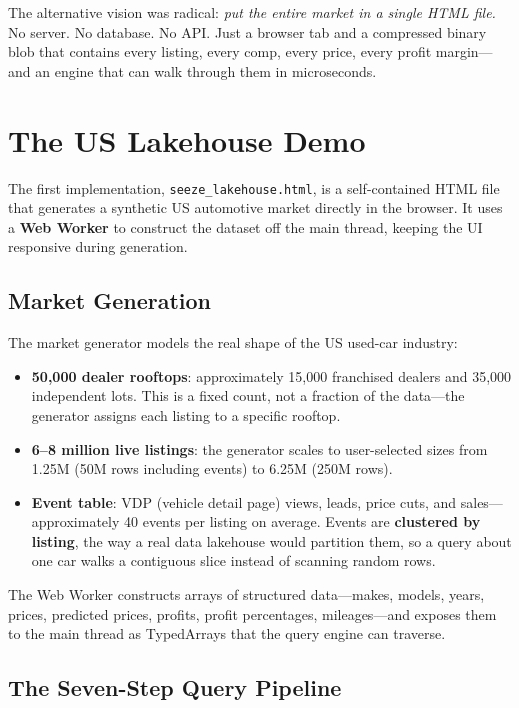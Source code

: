 \documentclass[11pt,a4paper,twoside]{book}
\begin{document}
The alternative vision was radical: \textit{put the entire market in a single HTML file.} No
server. No database. No API. Just a browser tab and a compressed binary blob that contains every
listing, every comp, every price, every profit margin---and an engine that can walk through them
in microseconds.

\section{The US Lakehouse Demo}

The first implementation, \texttt{seeze\_lakehouse.html}, is a self-contained HTML file that
generates a synthetic US automotive market directly in the browser. It uses a \textbf{Web Worker}
to construct the dataset off the main thread, keeping the UI responsive during generation.

\subsection{Market Generation}

The market generator models the real shape of the US used-car industry:

\begin{itemize}[leftmargin=*]
    \item \textbf{50,000 dealer rooftops}: approximately 15,000 franchised dealers and 35,000
          independent lots. This is a fixed count, not a fraction of the data---the generator
          assigns each listing to a specific rooftop.
    \item \textbf{6--8 million live listings}: the generator scales to user-selected sizes from
          1.25M (50M rows including events) to 6.25M (250M rows).
    \item \textbf{Event table}: VDP (vehicle detail page) views, leads, price cuts, and sales---
          approximately 40 events per listing on average. Events are \textbf{clustered by listing},
          the way a real data lakehouse would partition them, so a query about one car walks a
          contiguous slice instead of scanning random rows.
\end{itemize}

The Web Worker constructs arrays of structured data---makes, models, years, prices, predicted
prices, profits, profit percentages, mileages---and exposes them to the main thread as
TypedArrays that the query engine can traverse.

\subsection{The Seven-Step Query Pipeline}
\end{document}
